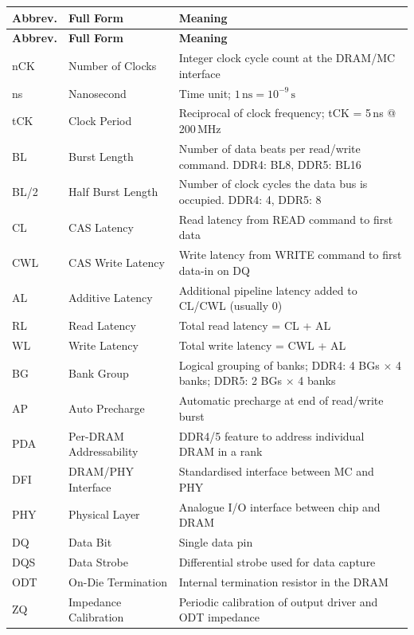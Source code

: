 \documentclass[11pt,a4paper]{article}
\begin{document}
\begin{longtable}{L{2.4cm} L{4.5cm} L{8cm}}
\toprule
\textbf{Abbrev.} & \textbf{Full Form} & \textbf{Meaning} \\
\midrule
\endfirsthead
\toprule
\textbf{Abbrev.} & \textbf{Full Form} & \textbf{Meaning} \\
\midrule
\endhead
\bottomrule
\endfoot
nCK  & Number of Clocks & Integer clock cycle count at the DRAM/MC interface \\
ns   & Nanosecond       & Time unit; $1\,\text{ns} = 10^{-9}\,\text{s}$ \\
tCK  & Clock Period     & Reciprocal of clock frequency; tCK = 5\,ns @ 200\,MHz \\
BL   & Burst Length     & Number of data beats per read/write command. DDR4: BL8, DDR5: BL16 \\
BL/2 & Half Burst Length & Number of clock cycles the data bus is occupied. DDR4: 4, DDR5: 8 \\
CL   & CAS Latency      & Read latency from READ command to first data \\
CWL  & CAS Write Latency & Write latency from WRITE command to first data-in on DQ \\
AL   & Additive Latency  & Additional pipeline latency added to CL/CWL (usually 0) \\
RL   & Read Latency      & Total read latency = CL + AL \\
WL   & Write Latency     & Total write latency = CWL + AL \\
BG   & Bank Group        & Logical grouping of banks; DDR4: 4 BGs $\times$ 4 banks; DDR5: 2 BGs $\times$ 4 banks \\
AP   & Auto Precharge    & Automatic precharge at end of read/write burst \\
PDA  & Per-DRAM Addressability & DDR4/5 feature to address individual DRAM in a rank \\
DFI  & DRAM/PHY Interface & Standardised interface between MC and PHY \\
PHY  & Physical Layer    & Analogue I/O interface between chip and DRAM \\
DQ   & Data Bit          & Single data pin \\
DQS  & Data Strobe       & Differential strobe used for data capture \\
ODT  & On-Die Termination & Internal termination resistor in the DRAM \\
ZQ   & Impedance Calibration & Periodic calibration of output driver and ODT impedance \\

\end{longtable}
\end{document}

